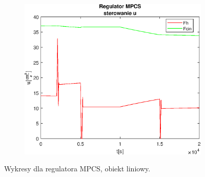 \begin{figure}[h!]
   \begin{subfigure}[b]{0.4\textwidth}
      \includegraphics[width=1\linewidth]{img/MPCSanaLin/MPCSLinControlN50Nu10l100.eps}
      \caption{}
      \label{fig:fig:MPCSLinN50Nu10l1003}
   \end{subfigure}
       
   \caption{Wykresy dla regulatora MPCS, obiekt liniowy.}
   \label{fig:MPCSLinN50Nu10l100}
\end{figure}
           
